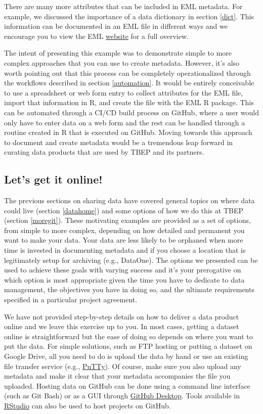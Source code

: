\documentclass[
]{book}
\begin{document}
There are many more attributes that can be included in EML metadata. For example, we discussed the importance of a data dictionary in section \ref{dict}. This information can be documented in an EML file in different ways and we encourage you to view the EML \href{https://docs.ropensci.org/EML/}{website} for a full overview.

The intent of presenting this example was to demonstrate simple to more complex approaches that you can use to create metadata. However, it's also worth pointing out that this process can be completely operationalized through the workflows described in section \ref{automation}. It would be entirely conceivable to use a spreadsheet or web form entry to collect attributes for the EML file, import that information in R, and create the file with the EML R package. This can be automated through a CI/CD build process on GitHub, where a user would only have to enter data on a web form and the rest can be handled through a routine created in R that is executed on GitHub. Moving towards this approach to document and create metadata would be a tremendous leap forward in curating data products that are used by TBEP and its partners.

\subsection{Let's get it online!}\label{lets-get-it-online}

The previous sections on sharing data have covered general topics on where data could live (section \ref{datahome}) and some options of how we do this at TBEP (section \ref{moregit}). These motivating examples are provided as a set of options, from simple to more complex, depending on how detailed and permanent you want to make your data. Your data are less likely to be orphaned when more time is invested in documenting metadata and if you choose a location that is legitimately setup for archiving (e.g., DataOne). The options we presented can be used to achieve these goals with varying success and it's your prerogative on which option is most appropriate given the time you have to dedicate to data management, the objectives you have in doing so, and the ultimate requirements specified in a particular project agreement.

We have not provided step-by-step details on how to deliver a data product online and we leave this exercise up to you. In most cases, getting a dataset online is straightforward but the ease of doing so depends on where you want to put the data. For simple solutions, such as FTP hosting or putting a dataset on Google Drive, all you need to do is upload the data by hand or use an existing file transfer service (e.g., \href{https://www.putty.org/}{PuTTy}). Of course, make sure you also upload any metadata and make it clear that your metadata accompanies the file you uploaded. Hosting data on GitHub can be done using a command line interface (such as Git Bash) or as a GUI through \href{https://desktop.github.com/}{GitHub Desktop}. Tools available in \href{https://happygitwithr.com/rstudio-git-github.html}{RStudio} can also be used to host projects on GitHub.
\end{document}
